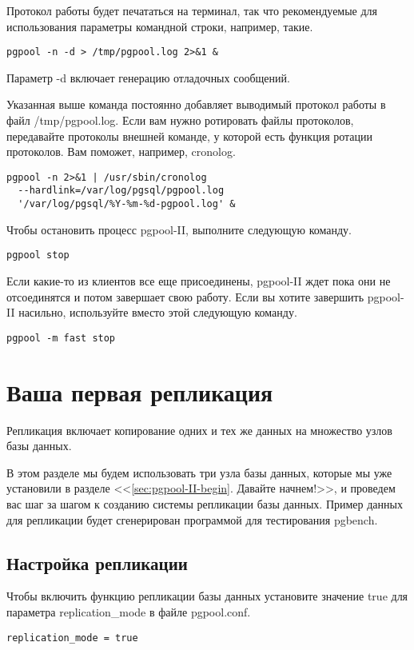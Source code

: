 Протокол работы будет печататься на терминал, так что рекомендуемые для использования параметры командной строки, 
например, такие.
\begin{lstlisting}[label=lst:pgpool13,caption=Запуск]
pgpool -n -d > /tmp/pgpool.log 2>&1 &
\end{lstlisting}

Параметр -d включает генерацию отладочных сообщений.

Указанная выше команда постоянно добавляет выводимый протокол работы в файл /tmp/pgpool.log. Если вам нужно 
ротировать файлы протоколов, передавайте протоколы внешней команде, у которой есть функция ротации протоколов. 
Вам поможет, например, cronolog.
\begin{lstlisting}[label=lst:pgpool14,caption=Запуск]
pgpool -n 2>&1 | /usr/sbin/cronolog
  --hardlink=/var/log/pgsql/pgpool.log
  '/var/log/pgsql/%Y-%m-%d-pgpool.log' &
\end{lstlisting}

Чтобы остановить процесс pgpool-II, выполните следующую команду.
\begin{lstlisting}[label=lst:pgpool15,caption=Остановка]
pgpool stop
\end{lstlisting}

Если какие-то из клиентов все еще присоединены, pgpool-II ждет пока они не отсоединятся и потом завершает свою работу. 
Если вы хотите завершить pgpool-II насильно, используйте вместо этой следующую команду.
\begin{lstlisting}[label=lst:pgpool16,caption=Остановка]
pgpool -m fast stop
\end{lstlisting}

\section{Ваша первая репликация}
\label{sec:pgpool-II-replica}
Репликация включает копирование одних и тех же данных на множество узлов базы данных.

В этом разделе мы будем использовать три узла базы данных, которые мы уже установили в разделе 
<<\ref{sec:pgpool-II-begin}. Давайте начнем!>>, и проведем вас шаг за шагом к созданию системы репликации базы данных. 
Пример данных для репликации будет сгенерирован программой для тестирования pgbench.

\subsection{Настройка репликации}
Чтобы включить функцию репликации базы данных установите значение true для параметра replication\_mode в файле pgpool.conf.
\begin{lstlisting}[label=lst:pgpool17,caption=Настройка репликации]
replication_mode = true
\end{lstlisting}

